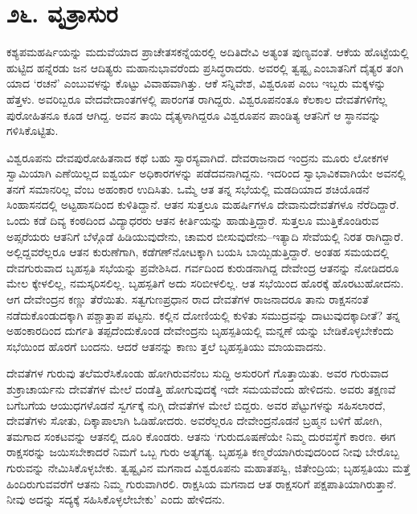 
\chapter{೨೬. ವೃತ್ರಾಸುರ}

ಕಶ್ಯಪಮಹರ್ಷಿಯನ್ನು ಮದುವೆಯಾದ ಪ್ರಾಚೇತಸಕನ್ನೆಯರಲ್ಲಿ ಅದಿತಿದೇವಿ ಅತ್ಯಂತ ಪುಣ್ಯವಂತೆ. ಆಕೆಯ ಹೊಟ್ಟೆಯಲ್ಲಿ ಹುಟ್ಟಿದ ಹನ್ನೆರಡು ಜನ ಆದಿತ್ಯರು ಮಹಾನುಭಾವರೆಂದು ಪ್ರಸಿದ್ಧರಾದರು. ಅವರಲ್ಲಿ ತ್ವಷ್ಟೃ ಎಂಬಾತನಿಗೆ ದೈತ್ಯರ ತಂಗಿ ಯಾದ ‘ರಚನೆ’ ಎಂಬುವಳನ್ನು ಕೊಟ್ಟು ವಿವಾಹವಾಗಿತ್ತು. ಆಕೆ ಸನ್ನಿವೇಶ, ವಿಶ್ವರೂಪ ಎಂಬ ಇಬ್ಬರು ಮಕ್ಕಳನ್ನು ಹೆತ್ತಳು. ಅವರಿಬ್ಬರೂ ವೇದವೇದಾಂತಗಳಲ್ಲಿ ಪಾರಂಗತ ರಾಗಿದ್ದರು. ವಿಶ್ವರೂಪನಂತೂ ಕೆಲಕಾಲ ದೇವತೆಗಳಿಗೆಲ್ಲ ಪುರೋಹಿತನೂ ಕೂಡ ಆಗಿದ್ದ. ಅವನ ತಾಯಿ ದೈತ್ಯಳಾಗಿದ್ದರೂ ವಿಶ್ವರೂಪನ ಪಾಂಡಿತ್ಯ ಆತನಿಗೆ ಆ ಸ್ಥಾನವನ್ನು ಗಳಿಸಿಕೊಟ್ಟಿತು.

ವಿಶ್ವರೂಪನು ದೇವಪುರೋಹಿತನಾದ ಕಥೆ ಬಹು ಸ್ವಾರಸ್ಯವಾಗಿದೆ. ದೇವರಾಜನಾದ ಇಂದ್ರನು ಮೂರು ಲೋಕಗಳ ಸ್ವಾಮಿಯಾಗಿ ಎಣೆಯಿಲ್ಲದ ಐಶ್ವರ್ಯ ಅಧಿಕಾರಗಳನ್ನು ಪಡೆದವನಾಗಿದ್ದನು. ಇದರಿಂದ ಸ್ವಾಭಾವಿಕವಾಗಿಯೇ ಅವನಲ್ಲಿ ತನಗೆ ಸಮಾನರಿಲ್ಲ ವೆಂಬ ಅಹಂಕಾರ ಉದಿಸಿತು. ಒಮ್ಮೆ ಆತ ತನ್ನ ಸಭೆಯಲ್ಲಿ ಮಡದಿಯಾದ ಶಚಿಯೊಡನೆ ಸಿಂಹಾಸನದಲ್ಲಿ ಅಟ್ಟಹಾಸದಿಂದ ಕುಳಿತಿದ್ದಾನೆ. ಆತನ ಸುತ್ತಲೂ ಮಹರ್ಷಿಗಳೂ ದೇವಾನುದೇವತೆಗಳೂ ನೆರೆದಿದ್ದಾರೆ. ಒಂದು ಕಡೆ ದಿವ್ಯ ಕಂಠದಿಂದ ವಿದ್ಯಾಧರರು ಆತನ ಕೀರ್ತಿಯನ್ನು ಹಾಡುತ್ತಿದ್ದಾರೆ. ಸುತ್ತಲೂ ಮುತ್ತಿಕೊಂಡಿರುವ ಅಪ್ಸರೆಯರು ಆತನಿಗೆ ಬೆಳ್ಗೊಡೆ ಹಿಡಿಯುವುದೇನು, ಚಾಮರ ಬೀಸುವುದೇನು–ಇತ್ಯಾದಿ ಸೇವೆಯಲ್ಲಿ ನಿರತ ರಾಗಿದ್ದಾರೆ. ಅಲ್ಲಿದ್ದವರೆಲ್ಲರೂ ಆತನ ಕುರುಣೆಗಾಗಿ, ಕಡೆಗಣ್​ನೋಟಕ್ಕಾಗಿ ಬಯಸಿ ಬಾಯ್ಬಿಡುತ್ತಿದ್ದಾರೆ. ಅಂತಹ ಸಮಯದಲ್ಲಿ ದೇವಗುರುವಾದ ಬೃಹಸ್ಪತಿ ಸಭೆಯನ್ನು ಪ್ರವೇಶಿಸಿದ. ಗರ್ವದಿಂದ ಕುರುಡನಾಗಿದ್ದ ದೇವೇಂದ್ರ ಆತನನ್ನು ನೋಡಿದರೂ ಮೇಲ ಕ್ಕೇಳಲಿಲ್ಲ, ನಮಸ್ಕರಿಸಲಿಲ್ಲ. ಬೃಹಸ್ಪತಿಗೆ ಅದು ಸರಿಬೀಳಲಿಲ್ಲ. ಆತ ಸಭೆಯಿಂದ ಹೊರಕ್ಕೆ ಹೊರಟುಹೋದನು. ಆಗ ದೇವೇಂದ್ರನ ಕಣ್ಣು ತೆರೆಯಿತು. ಸತ್ವಗುಣಪ್ರಧಾನ ರಾದ ದೇವತೆಗಳ ರಾಜನಾದರೂ ತಾನು ರಾಕ್ಷಸನಂತೆ ನಡೆದುಕೊಂಡುದಕ್ಕಾಗಿ ಪಶ್ಚಾತ್ತಾಪ ಪಟ್ಟನು. ಕಲ್ಲಿನ ದೋಣಿಯಲ್ಲಿ ಕುಳಿತು ಸಮುದ್ರವನ್ನು ದಾಟುವುದಕ್ಕಾದೀತೆ? ತನ್ನ ಅಹಂಕಾರದಿಂದ ದುರ್ಗತಿ ತಪ್ಪದೆಂದುಕೊಂಡ ದೇವೇಂದ್ರನು ಬೃಹಸ್ಪತಿಯಲ್ಲಿ ಮನ್ನಣೆ ಯನ್ನು ಬೇಡಿಕೊಳ್ಳಬೇಕೆಂದು ಸಭೆಯಿಂದ ಹೊರಗೆ ಬಂದನು. ಆದರೆ ಆತನನ್ನು ಕಾಣು ತ್ತಲೆ ಬೃಹಸ್ಪತಿಯು ಮಾಯವಾದನು.

ದೇವತೆಗಳ ಗುರುವು ತಲೆಮರೆಸಿಕೊಂಡು ಹೋಗಿರುವನೆಂಬ ಸುದ್ದಿ ಅಸುರರಿಗೆ ಗೊತ್ತಾಯಿತು. ಅವರ ಗುರುವಾದ ಶುಕ್ರಾಚಾರ್ಯನು ದೇವತೆಗಳ ಮೇಲೆ ದಂಡೆತ್ತಿ ಹೋಗುವುದಕ್ಕೆ ಇದೇ ಸಮಯವೆಂದು ಹೇಳಿದನು. ಅವರು ತಕ್ಷಣವೆ ಬಗೆಬಗೆಯ ಆಯುಧಗಳೊಡನೆ ಸ್ವರ್ಗಕ್ಕೆ ನುಗ್ಗಿ ದೇವತೆಗಳ ಮೇಲೆ ಬಿದ್ದರು. ಅವರ ಪೆಟ್ಟುಗಳನ್ನು ಸಹಿಸಲಾರದೆ, ದೇವತೆಗಳು ಸೋತು, ದಿಕ್ಕಾಪಾಲಾಗಿ ಓಡಿಹೋದರು. ಅವರೆಲ್ಲರೂ ದೇವೇಂದ್ರನೊಡನೆ ಬ್ರಹ್ಮನ ಬಳಿಗೆ ಹೋಗಿ, ತಮಗಾದ ಸಂಕಟವನ್ನು ಆತನಲ್ಲಿ ದೂರಿ ಕೊಂಡರು. ಆತನು ‘ಗುರುದೂಷಣೆಯೇ ನಿಮ್ಮ ದುರವಸ್ಥೆಗೆ ಕಾರಣ. ಈಗ ರಾಕ್ಷಸರನ್ನು ಜಯಿಸಬೇಕಾದರೆ ನಿಮಗೆ ಒಬ್ಬ ಗುರು ಅತ್ಯಗತ್ಯ. ಬೃಹಸ್ಪತಿ ಕಣ್ಮರೆಯಾಗಿರುವುದರಿಂದ ನೀವು ಬೇರೊಬ್ಬ ಗುರುವನ್ನು ನೇಮಿಸಿಕೊಳ್ಳಬೇಕು. ತ್ವಷ್ಟೃವಿನ ಮಗನಾದ ವಿಶ್ವರೂಪನು ಮಹಾತಪಸ್ವಿ, ಜಿತೇಂದ್ರಿಯ; ಬೃಹಸ್ಪತಿಯು ಮತ್ತೆ ಹಿಂದಿರುಗುವವರೆಗೆ ಆತನು ನಿಮ್ಮ ಗುರುವಾಗಿರಲಿ. ರಾಕ್ಷಸಿಯ ಮಗನಾದ ಆತ ರಾಕ್ಷಸರಿಗೆ ಪಕ್ಷಪಾತಿಯಾಗಿರುತ್ತಾನೆ. ನೀವು ಅದನ್ನು ಸದ್ಯಕ್ಕೆ ಸಹಿಸಿಕೊಳ್ಳಲೇಬೇಕು’ ಎಂದು ಹೇಳಿದನು.

